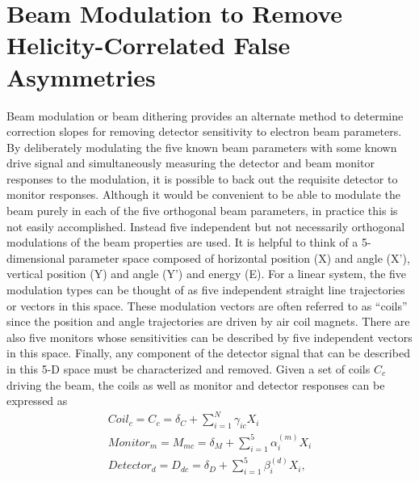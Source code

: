 \section{Beam Modulation to Remove Helicity-Correlated False Asymmetries}
Beam modulation or beam dithering provides an alternate method to determine correction slopes for removing detector sensitivity to electron beam parameters. By deliberately modulating the five known beam parameters with some known drive signal and simultaneously measuring the detector and beam monitor responses to the modulation, it is possible to back out the requisite detector to monitor responses. Although it would be convenient to be able to modulate the beam purely in each of the five orthogonal beam parameters, in practice this is not easily accomplished. Instead five independent but not necessarily orthogonal modulations of the beam properties are used. It is helpful to think of a 5-dimensional parameter space composed of horizontal position (X) and angle (X'), vertical position (Y) and angle (Y') and energy (E). For a linear system, the five modulation types can be thought of as five independent straight line trajectories or vectors in this space. These modulation vectors are often referred to as ``coils'' since the position and angle trajectories are driven by air coil magnets. There are also five monitors whose sensitivities can be described by five independent vectors in this space. Finally, any component of the detector signal that can be described in this 5-D space must be characterized and removed. Given a set of coils $C_c$ driving the beam, the coils as well as monitor and detector responses can be expressed as
\begin{align}
Coil_c=C_c=\delta_C+\sum_{i=1}^{N}\gamma_{ic}X_i\\
Monitor_{m}=M_{mc}=\delta_M+\sum_{i=1}^{5}\alpha_{i}^{(m)}X_i\\
Detector_{d}=D_{dc}=\delta_D+\sum_{i=1}^{5}\beta_{i}^{(d)}X_i,
\label{eq:5parameter_space}
\end{align}
